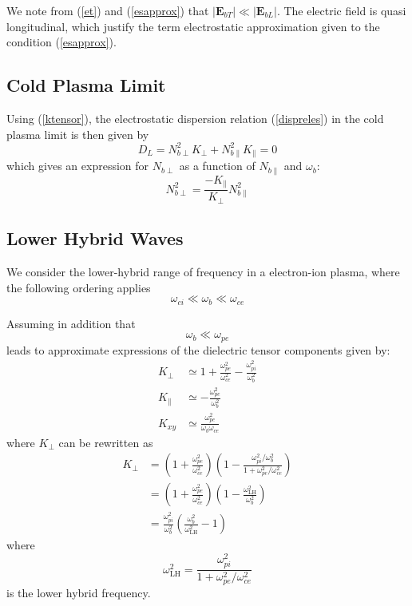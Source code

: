 We note from (\ref{et}) and (\ref{esapprox}) that $|\mathbf{E}_{bT}%
|\ll|\mathbf{E}_{bL}|$. The electric field is quasi longitudinal, which
justify the term electrostatic approximation given to the condition
(\ref{esapprox}).

\subsection{Cold Plasma Limit}

Using (\ref{ktensor}), the electrostatic dispersion relation (\ref{dispreles})
in the cold plasma limit is then given by
\begin{equation}
D_{L}=N_{b\perp}^{2}K_{\perp}+N_{b\parallel}^{2}K_{\parallel}=0
\label{disprelescpl}%
\end{equation}
which gives an expression for $N_{b\perp}$ as a function of $N_{b\parallel}$
and $\omega_{b}$:
\begin{equation}
N_{b\perp}^{2}=\frac{-K_{\parallel}}{K_{\perp}}N_{b\parallel}^{2}
\label{nperplh0}%
\end{equation}

\subsection{Lower Hybrid Waves}

We consider the lower-hybrid range of frequency in a electron-ion plasma,
where the following ordering applies
\begin{equation}
\omega_{ci}\ll\omega_{b}\ll\omega_{ce}%
\end{equation}

Assuming in addition that
\begin{equation}
\omega_{b}\ll\omega_{pe}%
\end{equation}
leads to approximate expressions of the dielectric tensor components given
by:
\begin{align}
K_{\perp}  &  \simeq1+\frac{\omega_{pe}^{2}}{\omega_{ce}^{2}}-\frac
{\omega_{pi}^{2}}{\omega_{b}^{2}}\nonumber\\
K_{\parallel}  &  \simeq-\frac{\omega_{pe}^{2}}{\omega_{b}^{2}}\label{kpar}\\
K_{xy}  &  \simeq\frac{\omega_{pe}^{2}}{\omega_{b}\omega_{ce}}
\label{disptenlh}%
\end{align}
where $K_{\perp}$ can be rewritten as%
\begin{align}
K_{\perp}  &  =\left(  1+\frac{\omega_{pe}^{2}}{\omega_{ce}^{2}}\right)
\left(  1-\frac{\omega_{pi}^{2}/\omega_{b}^{2}}{1+\omega_{pe}^{2}/\omega
_{ce}^{2}}\right) \label{kperp}\\
&  =\left(  1+\frac{\omega_{pe}^{2}}{\omega_{ce}^{2}}\right)  \left(
1-\frac{\omega_{\text{LH}}^{2}}{\omega_{b}^{2}}\right) \\
&  =\frac{\omega_{pi}^{2}}{\omega_{b}^{2}}\left(  \frac{\omega_{b}^{2}}%
{\omega_{\text{LH}}^{2}}-1\right)
\end{align}
where
\begin{equation}
\omega_{\text{LH}}^{2}=\frac{\omega_{pi}^{2}}{1+\omega_{pe}^{2}/\omega
_{ce}^{2}}%
\end{equation}
is the lower hybrid frequency.

